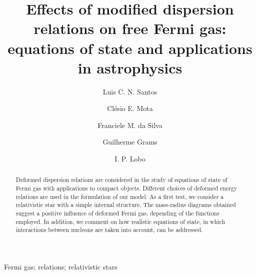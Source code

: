 \documentclass[final,5p,times,twocolumn]{elsarticle}
\begin{document}
\begin{frontmatter}

\title{Effects of modified dispersion relations on free Fermi gas: equations of state and applications in astrophysics}

\author{Luis C. N. Santos}
\address{Departamento de F\'isica, Universidade Federal da Para\'iba, \\Caixa Postal 5008, 58059-900, Jo\~ao Pessoa, PB, Brazil}

\author{Cl\'esio E. Mota}
\address{Departamento de F\'isica, CFM, Universidade Federal de Santa Catarina;\\ C.P. 476, CEP 88.040-900, Florian\'opolis, SC, Brasil}

\author{Franciele M. da Silva}
\address{Departamento de F\'isica, CFM, Universidade Federal de Santa Catarina;\\ C.P. 476, CEP 88.040-900, Florian\'opolis, SC, Brasil}

\author{Guilherme Grams}
\address{Univ. Lyon, Univ. Claude Bernard Lyon 1, CNRS/IN2P3, IP2I Lyon, UMR 5822, F-69622, Villeurbanne, France}

\author{I. P. Lobo}
\address{Department of Chemistry and Physics, Federal University of Para\'iba, Rodovia BR 079 - Km 12, 58397-000 Areia-PB,  Brazil}
\address{Physics Department, Federal University of Lavras, Caixa Postal 3037, 37200-000 Lavras-MG, Brazil}


\begin{abstract}
Deformed dispersion relations are considered in the study of equations of state of Fermi gas with applications to compact objects. Different choices of deformed energy relations are used in the formulation of our model. As a first test, we consider a relativistic star with a simple internal structure. The mass-radius diagrams obtained suggest a positive influence of deformed Fermi gas, depending of the functions employed. In addition, we comment on how realistic equations of state, in which interactions between nucleons are taken into account, can be addressed.
\end{abstract}

\begin{keyword}Fermi gas;  relations; relativistic stars
\end{keyword}

\end{frontmatter}
\end{document}
